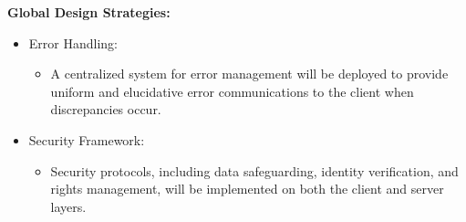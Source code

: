 \documentclass[a4paper, 12pt]{article}
\begin{document}
\textbf{Global Design Strategies:}
\begin{itemize}
    \item Error Handling:
    \begin{itemize}
        \item A centralized system for error management will be deployed to provide uniform and elucidative error communications to the client when discrepancies occur.
    \end{itemize}
    \item Security Framework:
    \begin{itemize}
        \item Security protocols, including data safeguarding, identity verification, and rights management, will be implemented on both the client and server layers.
    \end{itemize}
\end{itemize}
\end{document}
